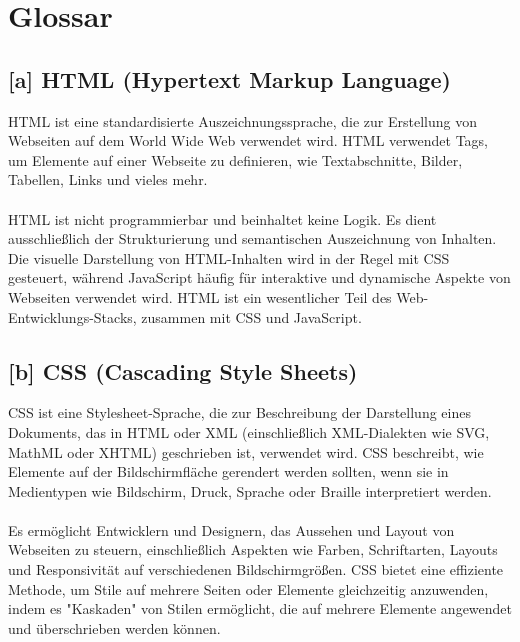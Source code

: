 \section{Glossar}
\subsection*{[a] HTML (Hypertext Markup Language)}
\label{glo:html1}
HTML ist eine standardisierte Auszeichnungssprache, die zur Erstellung von Webseiten auf dem World Wide Web verwendet wird. HTML verwendet Tags, um Elemente auf einer Webseite zu definieren, wie Textabschnitte, Bilder, Tabellen, Links und vieles mehr. \\\\
HTML ist nicht programmierbar und beinhaltet keine Logik. Es dient ausschließlich der Strukturierung und semantischen Auszeichnung von Inhalten. Die visuelle Darstellung von HTML-Inhalten wird in der Regel mit CSS gesteuert, während JavaScript häufig für interaktive und dynamische Aspekte von Webseiten verwendet wird. HTML ist ein wesentlicher Teil des Web-Entwicklungs-Stacks, zusammen mit CSS und JavaScript.
\subsection*{[b] CSS (Cascading Style Sheets)}
\label{glo:css}
CSS ist eine Stylesheet-Sprache, die zur Beschreibung der Darstellung eines Dokuments, das in HTML oder XML (einschließlich XML-Dialekten wie SVG, MathML oder XHTML) geschrieben ist, verwendet wird. CSS beschreibt, wie Elemente auf der Bildschirmfläche gerendert werden sollten, wenn sie in Medientypen wie Bildschirm, Druck, Sprache oder Braille interpretiert werden.\\\\
Es ermöglicht Entwicklern und Designern, das Aussehen und Layout von Webseiten zu steuern, einschließlich Aspekten wie Farben, Schriftarten, Layouts und Responsivität auf verschiedenen Bildschirmgrößen. CSS bietet eine effiziente Methode, um Stile auf mehrere Seiten oder Elemente gleichzeitig anzuwenden, indem es "Kaskaden" von Stilen ermöglicht, die auf mehrere Elemente angewendet und überschrieben werden können.
